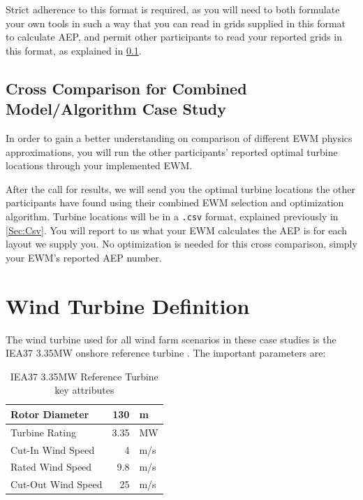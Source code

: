 \documentclass[12pt]{article}
\begin{document}
    Strict adherence to this format is required, as you will need to both formulate your own tools in such a way that you can read in grids supplied in this format to calculate AEP, and permit other participants to read your reported grids in this format, as explained in \cref{Sec:CrossComp}. 
    
    \subsection{Cross Comparison for Combined Model/Algorithm Case Study}\label{Sec:CrossComp}
    In order to gain a better understanding on comparison of different EWM physics approximations, you will run the other participants' reported optimal turbine locations through your implemented EWM.
    
    After the call for results, we will send you the optimal turbine locations the other participants have found using their combined EWM selection and optimization algorithm. Turbine locations will be in a \texttt{.csv} format, explained previously in \cref{Sec:Csv}. You will report to us what your EWM calculates the AEP is for each layout we supply you. No optimization is needed for this cross comparison, simply your EWM's reported AEP number.

\newpage
\appendix
\section{Wind Turbine Definition} \label{App:NREL335MW}
    The wind turbine used for all wind farm scenarios in these case studies is the IEA37 3.35MW onshore reference turbine \cite{NREL335MW}. The important parameters are:
    
    \begin{table}[H]
        \caption{IEA37 3.35MW Reference Turbine key attributes \cite{NREL335MW}}
        \centering
        \begin{tabular}{|l|r l|}
            \hline
            Rotor Diameter & 130 & m \\ \hline
            Turbine Rating & 3.35 & MW \\ \hline
            Cut-In Wind Speed & 4 & m/s \\ \hline
            Rated Wind Speed & 9.8 & m/s \\ \hline
            Cut-Out Wind Speed & 25 & m/s \\
            \hline
        \end{tabular}
        \label{tab:my_label}
    \end{table}
    
\end{document}
